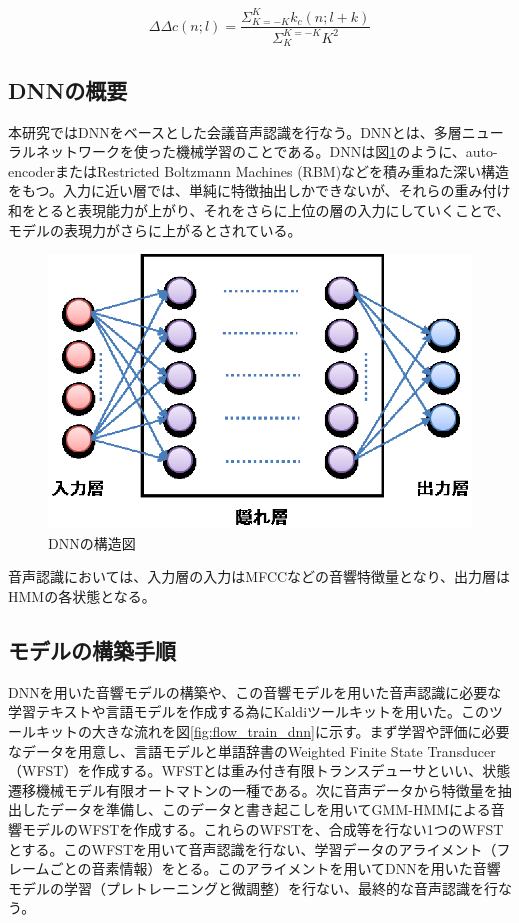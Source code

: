 {{\begin{equation}
\label{eq:deltadeltac}
\Delta\Delta c(n;l)=\frac{\Sigma_{K=-K}^{K}k_c(n;l+k)}{\Sigma_{K}^{K=-K}K^2}
\end{equation}
\subsection{DNNの概要}
本研究ではDNNをベースとした会議音声認識を行なう。DNNとは、多層ニューラルネットワークを使った機械学習のことである。DNNは図\ref{fig:dnn}のように、auto-encoderまたはRestricted Boltzmann Machines (RBM)などを積み重ねた深い構造をもつ。入力に近い層では、単純に特徴抽出しかできないが、それらの重み付け和をとると表現能力が上がり、それをさらに上位の層の入力にしていくことで、モデルの表現力がさらに上がるとされている。\par

\begin{figure}[H]
  \begin{center}
    \includegraphics{./figure/image_dnn.eps}
  \end{center}
  \caption{DNNの構造図}
  \label{fig:dnn}
\end{figure}

音声認識においては、入力層の入力はMFCCなどの音響特徴量となり、出力層はHMMの各状態となる。

\subsection{モデルの構築手順}}}\par
DNNを用いた音響モデルの構築や、この音響モデルを用いた音声認識に必要な学習テキストや言語モデルを作成する為にKaldiツールキット\cite{kaldi}を用いた。このツールキットの大きな流れを図\ref{fig:flow_train_dnn}に示す。まず学習や評価に必要なデータを用意し、言語モデルと単語辞書のWeighted Finite State Transducer （WFST）を作成する。WFSTとは重み付き有限トランスデューサといい、状態遷移機械モデル有限オートマトンの一種である。次に音声データから特徴量を抽出したデータを準備し、このデータと書き起こしを用いてGMM-HMMによる音響モデルのWFSTを作成する。これらのWFSTを、合成等を行ない1つのWFSTとする。このWFSTを用いて音声認識を行ない、学習データのアライメント（フレームごとの音素情報）をとる。このアライメントを用いてDNNを用いた音響モデルの学習（プレトレーニングと微調整）を行ない、最終的な音声認識を行なう。


